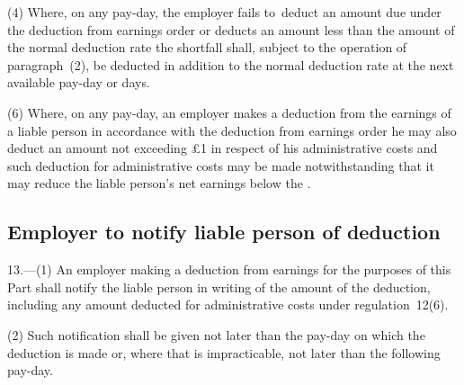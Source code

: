 \documentclass[12pt,a4paper]{article}
\begin{document}
(4) Where, on any pay-day, the employer fails to~deduct an amount due under the deduction from earnings order or deducts an amount less than the amount of the normal deduction rate the shortfall shall, subject to the operation of paragraph~(2), be deducted in addition to the normal deduction rate at the next available pay-day or days.


(6) Where, on any pay-day, an employer makes a deduction from the earnings of a liable person in accordance with the deduction from earnings order he may also deduct an amount not exceeding £1 in respect of his administrative costs and such deduction for administrative costs may be made notwithstanding that it may reduce the liable person’s net earnings below the  
.  %


\subsection[13. Employer to notify liable person of deduction]{Employer to notify liable person of deduction}

13.—(1) An employer making a deduction from earnings for the purposes of this Part shall notify the liable person in writing of the amount of the deduction, including any amount deducted for administrative costs under regulation~12(6).

(2) Such notification shall be given not later than the pay-day on which the deduction is made or, where that is impracticable, not later than the following pay-day.
\end{document}
